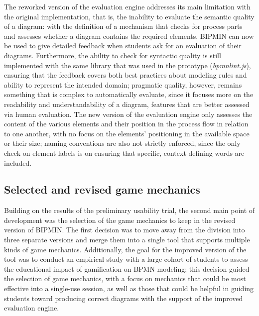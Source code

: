 The reworked version of the evaluation engine addresses its main limitation with the original implementation, that is, the inability to evaluate the semantic quality of a diagram: with the definition of a mechanism that checks for process parts and assesses whether a diagram contains the required elements, BIPMIN can now be used to give detailed feedback when students ask for an evaluation of their diagrams. Furthermore, the ability to check for syntactic quality is still implemented with the same library that was used in the prototype (\textit{bpmnlint.js}), ensuring that the feedback covers both best practices about modeling rules and ability to represent the intended domain; pragmatic quality, however, remains something that is complex to automatically evaluate, since it focuses more on the readability and understandability of a diagram, features that are better assessed via human evaluation. The new version of the evaluation engine only assesses the content of the various elements and their position in the process flow in relation to one another, with no focus on the elements' positioning in the available space or their size; naming conventions are also not strictly enforced, since the only check on element labels is on ensuring that specific, context-defining words are included. 


\subsection{Selected and revised game mechanics}

Building on the results of the preliminary usability trial, the second main point of development was the selection of the game mechanics to keep in the revised version of BIPMIN. The first decision was to move away from the division into three separate versions and merge them into a single tool that supports multiple kinds of game mechanics. Additionally, the goal for the improved version of the tool was to conduct an empirical study with a large cohort of students to assess the educational impact of gamification on BPMN modeling; this decision guided the selection of game mechanics, with a focus on mechanics that could be most effective into a single-use session, as well as those that could be helpful in guiding students toward producing correct diagrams with the support of the improved evaluation engine.

